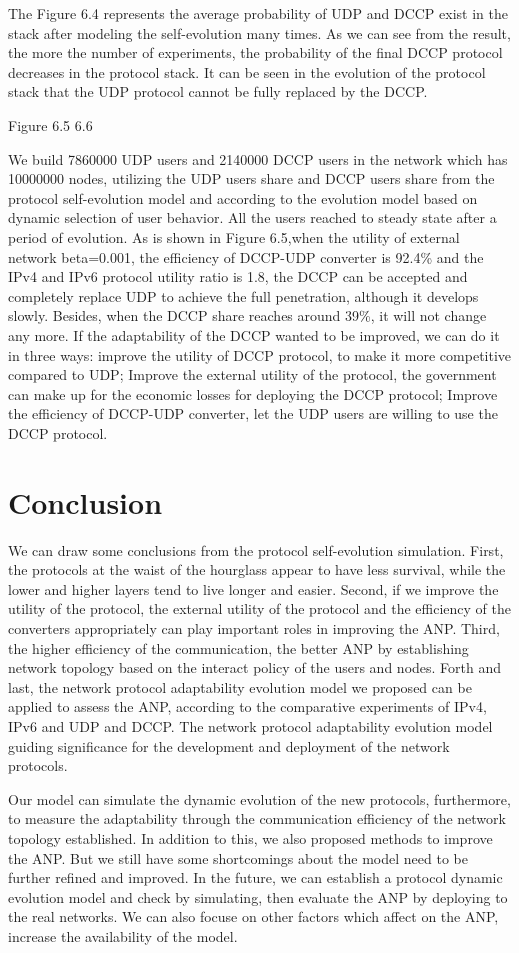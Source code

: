 \documentclass{article}
\begin{document}
The Figure 6.4 represents the average probability of UDP and DCCP exist in the stack after modeling the self-evolution many
times. As we can see from the result, the more the number of experiments, the probability of the final DCCP protocol decreases
in the protocol stack.  It can be seen in the evolution of the protocol stack that the UDP protocol cannot be fully replaced by the DCCP.

Figure 6.5 6.6

We build 7860000 UDP users and 2140000 DCCP users in the network which has 10000000 nodes, utilizing the UDP users share and
DCCP users share from the protocol self-evolution model and according to the evolution model based on dynamic selection of
user behavior. All the users reached to steady state after a period of evolution. As is shown in Figure 6.5,when the
utility of external network beta=0.001, the efficiency of DCCP-UDP converter is 92.4\% and the IPv4 and IPv6 protocol utility
ratio is 1.8, the DCCP can be accepted and completely replace UDP to achieve the full penetration, although it develops slowly.
Besides, when the DCCP share reaches around 39\%, it will not change any more. If the adaptability of the DCCP wanted to be improved,
we can do it in three ways: improve the utility of DCCP protocol, to make it more competitive compared to UDP; Improve the external
utility of the protocol, the government can make up for the economic losses for deploying the DCCP protocol; Improve the efficiency of
DCCP-UDP converter, let the UDP users are willing to use the DCCP protocol.
\section{Conclusion}
We can draw some conclusions from the protocol self-evolution simulation. First,  the protocols at the waist of the hourglass
appear to have less survival, while the lower and higher layers tend to live longer and easier. Second, if we improve the
utility of the protocol, the external utility of the protocol and the efficiency of the converters appropriately can play
important roles in improving the ANP. Third, the higher efficiency of the communication, the better ANP by establishing
network topology based on the interact policy of the users and nodes. Forth and last, the network protocol adaptability
evolution model we proposed can be applied to assess the ANP, according to the comparative experiments of IPv4, IPv6 and
UDP and DCCP. The network protocol adaptability evolution model guiding significance for the development and deployment
of the network protocols.

Our model can simulate the dynamic evolution of the new protocols, furthermore, to measure the adaptability through the
communication efficiency of the network topology established. In addition to this, we also proposed methods to improve
the ANP. But we still have some shortcomings about the model need to be further refined and improved. In the future,
we can establish a protocol dynamic evolution model and check by simulating,  then evaluate the ANP by deploying to
the real networks. We can also focuse on other factors which affect on the ANP, increase the availability of the model.
\end{document}
